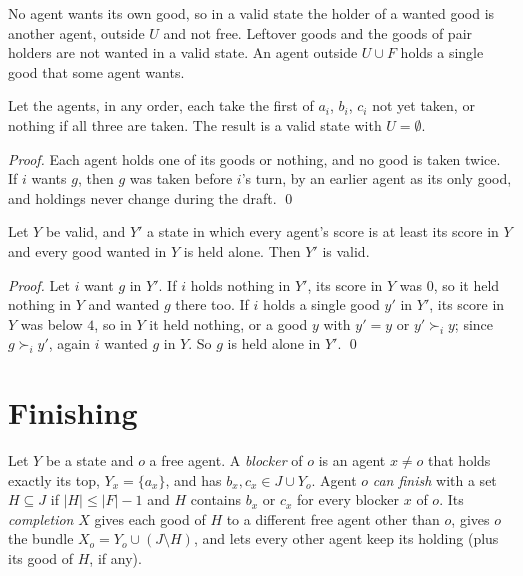 \documentclass[runningheads,11pt]{llncs}
\begin{document}
\noindent No agent wants its own good, so in a valid state the holder of a wanted good is another agent, outside $U$ and not free. Leftover goods and the goods of pair holders are not wanted in a valid state. An agent outside $U\cup F$ holds a single good that some agent wants.

\begin{lemma}\label{lem:draft}
Let the agents, in any order, each take the first of $a_i$, $b_i$, $c_i$ not yet taken, or nothing if all three are taken. The result is a valid state with $U=\emptyset$.
\end{lemma}

\begin{proof}
Each agent holds one of its goods or nothing, and no good is taken twice. If $i$ wants $g$, then $g$ was taken before $i$'s turn, by an earlier agent as its only good, and holdings never change during the draft. \qed
\end{proof}

\begin{lemma}\label{lem:stay}
Let $Y$ be valid, and $Y'$ a state in which every agent's score is at least its score in $Y$ and every good wanted in $Y$ is held alone. Then $Y'$ is valid.
\end{lemma}

\begin{proof}
Let $i$ want $g$ in $Y'$. If $i$ holds nothing in $Y'$, its score in $Y$ was $0$, so it held nothing in $Y$ and wanted $g$ there too. If $i$ holds a single good $y'$ in $Y'$, its score in $Y$ was below $4$, so in $Y$ it held nothing, or a good $y$ with $y'=y$ or $y'\succ_i y$; since $g\succ_i y'$, again $i$ wanted $g$ in $Y$. So $g$ is held alone in $Y'$. \qed
\end{proof}

\section{Finishing}\label{sec:finish}

\begin{definition}\label{def:finish}
Let $Y$ be a state and $o$ a free agent. A \emph{blocker} of $o$ is an agent $x\ne o$ that holds exactly its top, $Y_x=\{a_x\}$, and has $b_x,c_x\in J\cup Y_o$. Agent $o$ \emph{can finish} with a set $H\subseteq J$ if $|H|\le|F|-1$ and $H$ contains $b_x$ or $c_x$ for every blocker $x$ of $o$. Its \emph{completion} $X$ gives each good of $H$ to a different free agent other than $o$, gives $o$ the bundle $X_o=Y_o\cup(J\setminus H)$, and lets every other agent keep its holding (plus its good of $H$, if any).
\end{definition}
\end{document}
